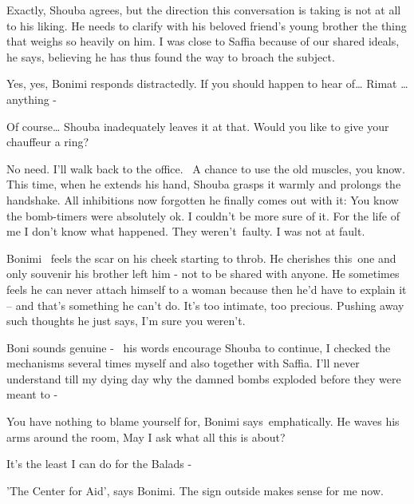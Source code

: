 \documentclass[letterpaper]{article}
\begin{document}
{\textquotedbl}Exactly,{\textquotedbl} Shouba agrees, but the direction this conversation is taking is not at all to his
liking. He needs to clarify with his beloved friend's young brother the thing that weighs so heavily on him.
{\textquotedbl}I was close to Saffia because of our shared ideals,{\textquotedbl} he says, believing he has thus found
the way to broach the subject. 

{\textquotedbl}Yes, yes,{\textquotedbl} Bonimi responds distractedly. {\textquotedbl}If you should happen to hear
of{\dots} Rimat {\dots} anything -{\textquotedbl} 

{\textquotedbl}Of course\textcolor[rgb]{0.0,0.4392157,0.7529412}{{\dots}}{\textquotedbl} Shouba inadequately leaves it
at that. {\textquotedbl}Would you like to give your chauffeur a ring?{\textquotedbl}

{\textquotedbl}No need. I'll walk back to the office. \ A chance to use the old muscles, you know.{\textquotedbl} This
time, when he extends his hand, Shouba grasps it warmly and prolongs the handshake. All inhibitions now forgotten he
finally comes out with it: {\textquotedbl}You know the bomb-timers were absolutely ok. I couldn't be more sure of it.
For the life of me I don't know what happened. They weren't~faulty. I was not at fault.{\textquotedbl}

Bonimi~ feels the scar on his cheek starting to throb. He cherishes this~one and only souvenir his brother left him -
not to be shared with anyone. He sometimes feels he can never attach himself to a woman because then he'd have to
explain it -- and that's something he can't do. It's too intimate, too precious. Pushing away such thoughts he just
says, {\textquotedbl}I'm sure you weren't.{\textquotedbl}

Boni sounds genuine - \ his words encourage Shouba to continue, {\textquotedbl}I checked the mechanisms several times
myself and also together with Saffia. I'll never understand till my dying day\textcolor[rgb]{0.0,0.4392157,0.7529412}{
}why the damned\textcolor[rgb]{0.0,0.4392157,0.7529412}{ }bombs exploded before they were meant to -{\textquotedbl} 

{\textquotedbl}You have nothing to blame yourself for,{\textquotedbl} Bonimi says~emphatically. He waves his arms around
the room, {\textquotedbl}May I ask what all this is about?{\textquotedbl}

{\textquotedbl}It's the least I can do for the Balads -{\textquotedbl}

{\textquotedbl}'The Center for Aid',{\textquotedbl} says Bonimi. {\textquotedbl}The sign outside makes sense for me
now.{\textquotedbl}
\end{document}
